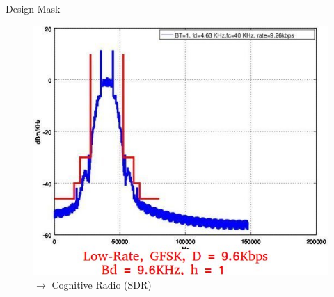 \documentclass[8pt]{beamer}
\newcommand{\1}{\mathbbm 1}
\begin{document}
\begin{frame}{Design Mask}
\begin{figure}
{\includegraphics[scale=0.2]{figures/masklow.jpg}$\rightarrow$ Cognitive Radio (SDR)}
\end{figure}


\end{frame}
\end{document}
